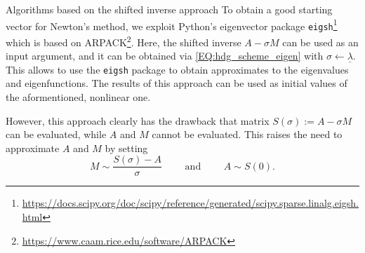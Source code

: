 \documentclass[a4paper, english, 12pt, reqno, draft]{amsart}
\makeatletter
\theoremstyle{definition}
\theoremstyle{remark}
\numberwithin{equation}{section}
\newcommand{\code}[1]{\texttt{#1}}
\newcommand{\eigenval}{\ensuremath{\underline \lambda}}
\def\paragraph{\@startsection{paragraph}{4}%
  \z@\z@{-\fontdimen2\font}%
  {\normalfont\scshape}}
\makeatother
\begin{document}
\paragraph{Algorithms based on the shifted inverse approach}
% 
To obtain a good starting vector for Newton's method, we exploit Python's eigenvector package \code{eigsh}\footnote{\url{https://docs.scipy.org/doc/scipy/reference/generated/scipy.sparse.linalg.eigsh.html}} which is based on ARPACK\footnote{\url{https://www.caam.rice.edu/software/ARPACK}}. Here, the shifted inverse $A - \sigma M$ can be used as an input argument, and it can be obtained via \eqref{EQ:hdg_scheme_eigen} with $\sigma \leftarrow \eigenval$. This allows to use the \code{eigsh} package to obtain approximates to the eigenvalues and eigenfunctions. The results of this approach can be used as initial values of the aformentioned, nonlinear one.

However, this approach clearly has the drawback that matrix $S(\sigma) := A - \sigma M$ can be evaluated, while $A$ and $M$ cannot be evaluated. This raises the need to approximate $A$ and $M$ by setting
% 
\begin{equation}
 M \sim \frac{S(\sigma) - A}{\sigma} \qquad \text{ and } \qquad A \sim S(0).
\end{equation}
% 
\end{document}
